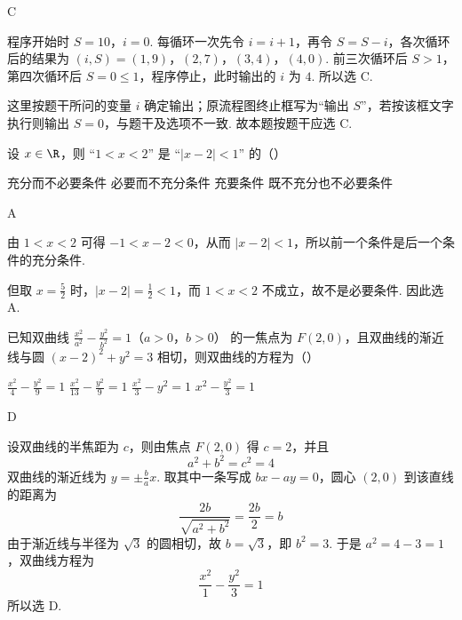\begin{answer}
C
\end{answer}

\begin{solution}
程序开始时 \(S=10\)，\(i=0\). 每循环一次先令 \(i=i+1\)，再令 \(S=S-i\)，各次循环后的结果为
\((i,S)=(1,9)\)，\((2,7)\)，\((3,4)\)，\((4,0)\).
前三次循环后 \(S>1\)，第四次循环后 \(S=0\leqslant1\)，程序停止，此时输出的 \(i\) 为 \(4\). 所以选 C.

这里按题干所问的变量 \(i\) 确定输出；原流程图终止框写为“输出 \(S\)”，若按该框文字执行则输出 \(S=0\)，与题干及选项不一致. 故本题按题干应选 C.
\end{solution}

\begin{problem}
设 \(x \in \R\)，则 “\(1 < x < 2\)” 是 “\(|x - 2| < 1\)” 的（\quad）

\choices
    {充分而不必要条件}
    {必要而不充分条件}
    {充要条件}
    {既不充分也不必要条件}
\end{problem}

\begin{answer}
A
\end{answer}

\begin{solution}
由 \(1<x<2\) 可得 \(-1<x-2<0\)，从而 \(\lvert x-2\rvert<1\)，所以前一个条件是后一个条件的充分条件.

但取 \(x=\frac{5}{2}\) 时，\(\lvert x-2\rvert=\frac12<1\)，而 \(1<x<2\) 不成立，故不是必要条件. 因此选 A.
\end{solution}

\begin{problem}
已知双曲线 \(\frac{x^2}{a^2} - \frac{y^2}{b^2} = 1\)（\(a > 0\)，\(b > 0\)） 的一焦点为 \(F(2,0)\)，且双曲线的渐近线与圆 \((x - 2)^2 + y^2 = 3\) 相切，则双曲线的方程为（\quad）

\choices
    {\(\frac{x^2}{4} -\frac{y^2}{9} = 1\)}
    {\(\frac{x^2}{13} -\frac{y^2}{9} = 1\)}
    {\(\frac{x^2}{3} - y^2 = 1\)}
    {\(x^{2} - \frac{y^{2}}{3} = 1\)}
\end{problem}

\begin{answer}
D
\end{answer}

\begin{solution}
设双曲线的半焦距为 \(c\)，则由焦点 \(F(2,0)\) 得 \(c=2\)，并且
\[
a^2+b^2=c^2=4
\]
双曲线的渐近线为 \(y=\pm\frac{b}{a}x\). 取其中一条写成 \(bx-ay=0\)，圆心 \((2,0)\) 到该直线的距离为
\[
\frac{2b}{\sqrt{a^2+b^2}}=\frac{2b}{2}=b
\]
由于渐近线与半径为 \(\sqrt3\) 的圆相切，故 \(b=\sqrt3\)，即 \(b^2=3\). 于是 \(a^2=4-3=1\)，双曲线方程为
\[
\frac{x^2}{1}-\frac{y^2}{3}=1
\]
所以选 D.
\end{solution}

